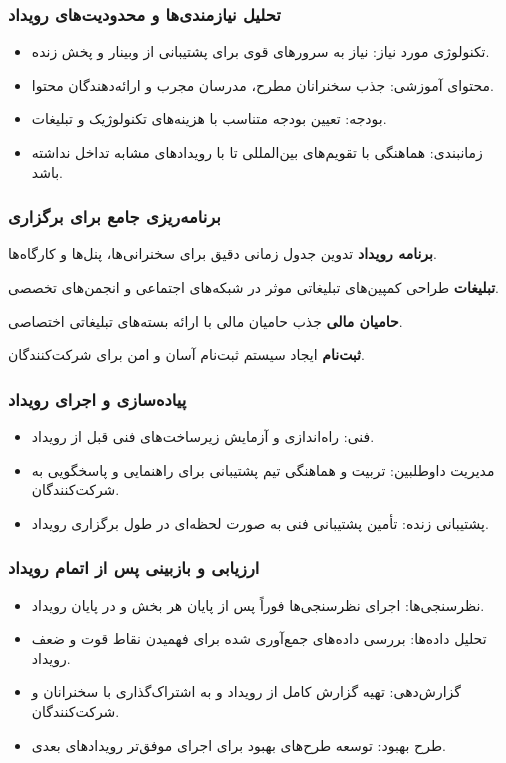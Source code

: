 \subsubsection*{تحلیل نیازمندی‌ها و محدودیت‌های رویداد}
\begin{itemize}
	\item تکنولوژی مورد نیاز: نیاز به سرورهای قوی برای پشتیبانی از وبینار و پخش زنده.
	\item محتوای آموزشی: جذب سخنرانان مطرح، مدرسان مجرب و ارائه‌دهندگان محتوا.
	\item بودجه: تعیین بودجه متناسب با هزینه‌های تکنولوژیک و تبلیغات.
	\item زمانبندی: هماهنگی با تقویم‌های بین‌المللی تا با رویدادهای مشابه تداخل نداشته باشد.
\end{itemize}

\subsubsection*{برنامه‌ریزی جامع برای برگزاری}
\textbf{برنامه رویداد}
تدوین جدول زمانی دقیق برای سخنرانی‌ها، پنل‌ها و کارگاه‌ها.

\textbf{تبلیغات}
طراحی کمپین‌های تبلیغاتی موثر در شبکه‌های اجتماعی و انجمن‌های تخصصی.

\textbf{حامیان مالی}
جذب حامیان مالی با ارائه بسته‌های تبلیغاتی اختصاصی.

\textbf{ثبت‌نام}
ایجاد سیستم ثبت‌نام آسان و امن برای شرکت‌کنندگان.

\subsubsection*{پیاده‌سازی و اجرای رویداد}
\begin{itemize}
	\item فنی: راه‌اندازی و آزمایش زیرساخت‌های فنی قبل از رویداد.
	\item مدیریت داوطلبین: تربیت و هماهنگی تیم پشتیبانی برای راهنمایی و پاسخگویی به شرکت‌کنندگان.
	\item پشتیبانی زنده: تأمین پشتیبانی فنی به صورت لحظه‌ای در طول برگزاری رویداد.
\end{itemize}

\subsubsection*{ارزیابی و بازبینی پس از اتمام رویداد}
\begin{itemize}
	\item نظرسنجی‌ها: اجرای نظرسنجی‌ها فوراً پس از پایان هر بخش و در پایان رویداد.
	\item تحلیل داده‌ها: بررسی داده‌های جمع‌آوری شده برای فهمیدن نقاط قوت و ضعف رویداد.
	\item گزارش‌دهی: تهیه گزارش کامل از رویداد و به اشتراک‌گذاری با سخنرانان و شرکت‌کنندگان.
	\item طرح بهبود: توسعه طرح‌های بهبود برای اجرای موفق‌تر رویدادهای بعدی.
\end{itemize}

